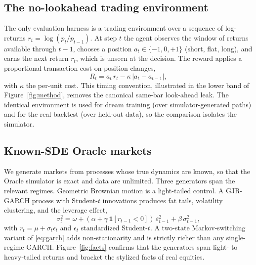 \documentclass[conference]{IEEEtran}
\begin{document}
\subsection{The no-lookahead trading environment}\label{sec:env}
The only evaluation harness is a trading environment over a sequence of log-returns $r_t = \log(p_t/p_{t-1})$. At step $t$ the agent observes the window of returns available through $t-1$, chooses a position $a_t \in \{-1, 0, +1\}$ (short, flat, long), and earns the next return $r_t$, which is unseen at the decision. The reward applies a proportional transaction cost on position changes,
\begin{equation}
R_t = a_t \, r_t - \kappa \, |a_t - a_{t-1}|,
\label{eq:reward}
\end{equation}
with $\kappa$ the per-unit cost. This timing convention, illustrated in the lower band of Figure~\ref{fig:method}, removes the canonical same-bar look-ahead leak. The identical environment is used for dream training (over simulator-generated paths) and for the real backtest (over held-out data), so the comparison isolates the simulator.

\subsection{Known-SDE Oracle markets}\label{sec:markets}
We generate markets from processes whose true dynamics are known, so that the Oracle simulator is exact and data are unlimited. Three generators span the relevant regimes. Geometric Brownian motion is a light-tailed control. A GJR-GARCH process with Student-$t$ innovations produces fat tails, volatility clustering, and the leverage effect,
\begin{equation}
\sigma_t^2 = \omega + (\alpha + \gamma\,\mathbf{1}[r_{t-1}<0])\,\varepsilon_{t-1}^2 + \beta\,\sigma_{t-1}^2,
\label{eq:garch}
\end{equation}
with $r_t = \mu + \sigma_t \epsilon_t$ and $\epsilon_t$ standardized Student-$t$. A two-state Markov-switching variant of \eqref{eq:garch} adds non-stationarity and is strictly richer than any single-regime GARCH. Figure~\ref{fig:facts} confirms that the generators span light- to heavy-tailed returns and bracket the stylized facts of real equities.
\end{document}
